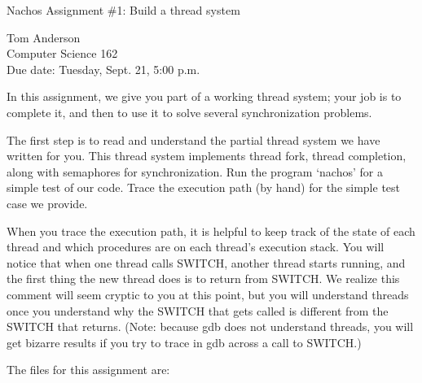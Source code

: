 


\begin{center}
{\large Nachos Assignment \#1: Build a thread system

\vspace{.2in}
Tom Anderson\\
Computer Science 162\\
Due date: Tuesday, Sept. 21, 5:00 p.m.
}
\end{center}

\vspace{.2in}

In this assignment, we give you part of a working thread system;
your job is to complete it, and then to use it to solve
several synchronization problems.

The first step is to read and understand the partial thread system
we have written for you.  This thread system implements thread fork,
thread completion, along with semaphores for synchronization.
Run the program `nachos' for a simple test of our code.
Trace the execution path (by hand) for the simple test case
we provide.

When you trace the execution path, it is helpful to keep track
of the state of each thread and which procedures are on each thread's
execution stack.
You will notice that when one thread calls SWITCH, another thread
starts running, and the first thing the new thread does is
to return from SWITCH.
We realize this comment will seem cryptic to you at this point, but you
will understand threads once you understand
why the SWITCH that gets called is different from the SWITCH that returns.
(Note: because gdb does not understand threads, you will get bizarre
results if you try to trace in gdb across a call to SWITCH.)

The files for this assignment are:

